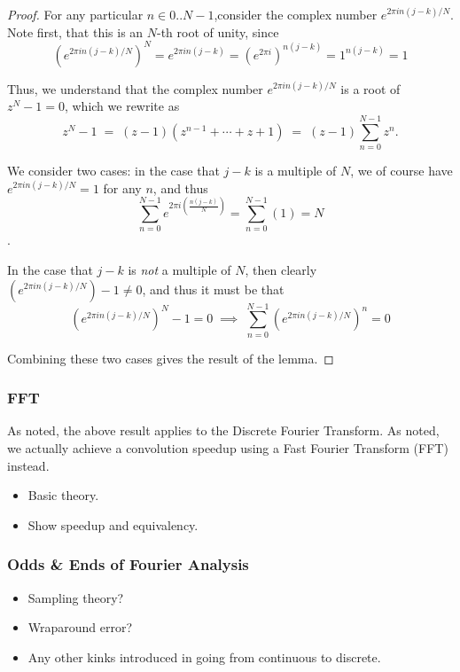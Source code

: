 		\begin{proof}
		
		For any particular $n \in 0..N-1$,consider the complex number $e^{2\pi i n(j-k)/N}$. Note first, that this is an $N$-th root of unity, since
		\[
		\left(e^{2\pi i n(j-k)/N}\right)^N = e^{2\pi i n(j-k)} = \left(e^{2\pi i}\right)^{n(j-k)}
		= 1^{n(j-k)} = 1
		\]
	
	Thus, we understand that the complex number $e^{2\pi i n(j-k)/N}$ is a root of $z^N -1 = 0$, which we rewrite as
	\[ z^N -1 \;=\; (z-1)(z^{n-1} + \cdots + z + 1) \;=\; (z-1)\sum_{n=0}^{N-1} z^n .
	\]

We consider two cases: in the case that $j-k$ is a multiple of $N$, we of course have $e^{2\pi i n(j-k)/N} = 1$ for any $n$, and thus
\[
\sum_{n=0}^{N-1} e^{2\pi i\left(\frac{n(j-k)}{N}\right)} = \sum_{n=0}^{N-1} \left(1\right) = N
\].

In the case that $j-k$ is \textit{not} a multiple of $N$, then clearly $\left(e^{2\pi i n(j-k)/N}\right)-1 \ne 0$, and thus it must be that
\[\left(e^{2\pi i n(j-k)/N}\right)^N -1 = 0 \;\implies\; \sum_{n=0}^{N-1} \left(e^{2\pi i n(j-k)/N}\right)^n = 0\]
	
	Combining these two cases gives the result of the lemma.
		\end{proof}
				
		\subsubsection{FFT}
		
		As noted, the above result applies to the Discrete Fourier Transform. As noted, we actually achieve a convolution speedup using a Fast Fourier Transform (FFT) instead.
		
		\begin{itemize}
			\item Basic theory.
			\item Show speedup and equivalency.
		\end{itemize}
		
		\subsubsection{Odds \& Ends of Fourier Analysis}
		\begin{itemize}
			\item Sampling theory?
			\item Wraparound error?
			\item Any other kinks introduced in going from continuous to discrete.
		\end{itemize}


